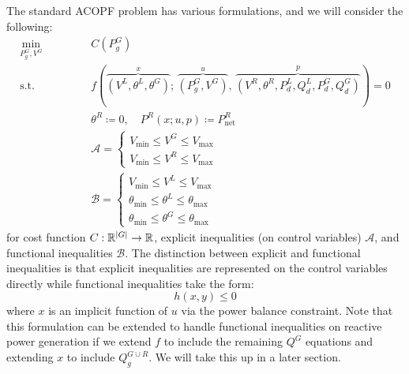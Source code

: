 The standard ACOPF problem has various formulations, and we will consider the following:
\begin{subequations}
\label{eq:acopf}
\begin{alignat}{3}
\underset{P_g^G, V^G}{\min} & \quad && C(P_g^G) \\
\text{s.t.} && \quad & f\left(\overset{x}{\overbrace{(V^L, \theta^L, \theta^G)}};\, \overset{u}{\overbrace{(P_g^G, V^G)}},\, \overset{p}{\overbrace{(V^R, \theta^R, P_{d}^L, Q_{d}^L, P_{d}^G, Q_{d}^G)}} \right) = 0 \\
&&& \theta^R \coloneqq 0, \quad P^R (x; u, p) \coloneqq P_{\text{net}}^R \\
&&& \mathcal{A} =
\begin{cases}
V_{\min} \leq V^G \leq V_{\max} \\
V_{\min} \leq V^R \leq V_{\max}
\end{cases}\\
&&& \mathcal{B} =
\begin{cases}
V_{\min} \leq V^L \leq V_{\max} \\
\theta_{\min} \leq \theta^{L} \leq \theta_{\max} \\
\theta_{\min} \leq \theta^{G} \leq \theta_{\max}
\end{cases}
\end{alignat}
\end{subequations}
for cost function $C: \mathbb{R}^{|G|}\to\mathbb{R}$, explicit inequalities (on control variables) $\mathcal{A}$, and functional inequalities $\mathcal{B}$.
The distinction between explicit and functional inequalities \cite{Dommel1968} is that explicit inequalities are represented on the control variables directly while functional inequalities take the form:
$$
h(x,y) \leq 0
$$
where $x$ is an implicit function of $u$ via the power balance constraint.
Note that this formulation can be extended to handle functional inequalities on reactive power generation if we extend $f$ to include the remaining $Q^G$ equations and extending $x$ to include $Q_g^{G\cup R}$.
We will take this up in a later section.